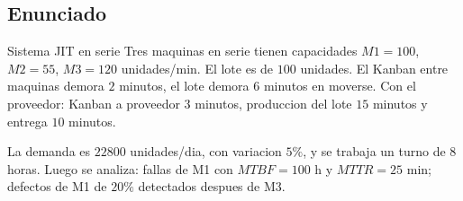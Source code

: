 \subsection{Enunciado}

\begin{enunciado}{Sistema JIT en serie}
Tres maquinas en serie tienen capacidades \(M1=100\), \(M2=55\), \(M3=120\) unidades/min. El lote es de \(100\) unidades. El Kanban entre maquinas demora \(2\) minutos, el lote demora \(6\) minutos en moverse. Con el proveedor: Kanban a proveedor \(3\) minutos, produccion del lote \(15\) minutos y entrega \(10\) minutos.

La demanda es \(22800\) unidades/dia, con variacion \(5\%\), y se trabaja un turno de \(8\) horas. Luego se analiza: fallas de M1 con \(MTBF=100\) h y \(MTTR=25\) min; defectos de M1 de \(20\%\) detectados despues de M3.
\end{enunciado}
